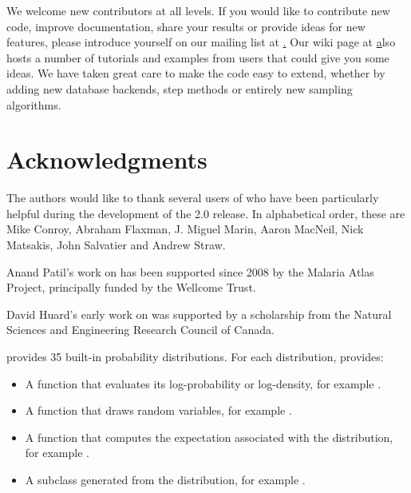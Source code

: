 \documentclass[]{jss}
\begin{document}
We welcome new contributors at all levels. If you would like to contribute new code, improve documentation, share your results or provide ideas for new features, please introduce yourself on our mailing list at \href{pymc@googlegroups.com}. Our wiki page at \href{http://code.google.com/p/pymc/w/list} also hosts a number of tutorials and examples from users that could give you some ideas. We have taken great care to make the code easy to extend, whether by adding new database backends, step methods or entirely new sampling algorithms.





\section[Acknowledgments]{Acknowledgments}
\label{chap:acknowledge}
The authors would like to thank several users of  who have been particularly helpful during the development of the 2.0 release. In alphabetical order, these are Mike Conroy, Abraham Flaxman, J. Miguel Marin, Aaron MacNeil, Nick Matsakis, John Salvatier and Andrew Straw.

Anand Patil's work on  has been supported since 2008 by the Malaria Atlas Project, principally funded by the Wellcome Trust.

David Huard's early work on  was supported by a scholarship from the Natural Sciences and Engineering Research Council of Canada. 
\newpage
\appendix




 provides 35 built-in probability distributions. For each distribution,  provides:
\begin{itemize}
    \item A function that evaluates its log-probability or log-density, for example .
    \item A function that draws random variables, for example .
    \item A function that computes the expectation associated with the distribution, for example .
    \item A  subclass generated from the distribution, for example .
\end{itemize}
\end{document}
